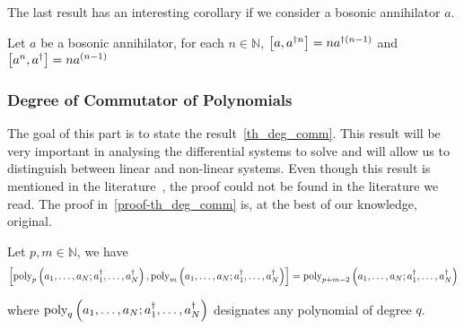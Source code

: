 The last result has an interesting corollary if we consider a bosonic annihilator $a$.

\begin{corollary}
    Let $a$ be a bosonic annihilator, for each $n \in \mathbb{N}$, $\commutator{a}{a^{\dagger n}} = n a^{\dagger (n-1)}$ and $\commutator{a^n}{a^\dagger} = n a^{(n-1)}$
\end{corollary}

\subsubsection{Degree of Commutator of Polynomials}

The goal of this part is to state the result~\autoref{th_deg_comm}. This result will be very important in analysing the differential systems to solve and will allow us to distinguish between linear and non-linear systems. Even though this result is mentioned in the literature~\cite{quesada_deg}, the proof could not be found in the literature we read. The proof in~\autoref{proof-th_deg_comm} is, at the best of our knowledge, original.

\begin{theorem} \label{th_deg_comm}
    Let $p, m \in \mathbb{N}$, we have
    \begin{equation}
        \commutator{\poly{p}{a_1, \ldots, a_N; a^\dagger_1, \ldots, a^\dagger_N}}{\poly{m}{a_1, \ldots, a_N; a^\dagger_1, \ldots, a^\dagger_N}} = \poly{p+m-2}{a_1, \ldots, a_N; a^\dagger_1, \ldots, a^\dagger_N}
    \end{equation}

    where $\text{poly}_{q}\left(a_1, \ldots, a_N; a^\dagger_1, \ldots, a^\dagger_N\right)$ designates any polynomial of degree $q$.
\end{theorem}